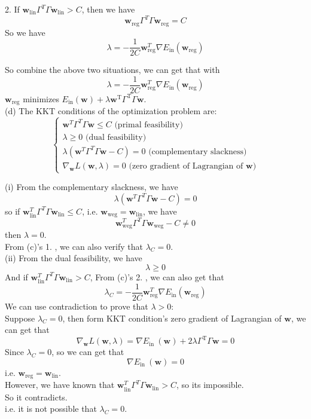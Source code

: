 2. If $\mathbf{w}_{\text{lin}}\Gamma^{T} \Gamma \mathbf{w}_{\text{lin}}> C$, then we have
$$\mathbf{w}_{\text{reg}}\Gamma^{T} \Gamma \mathbf{w}_{\text{reg}}= C$$
So we have
$$\lambda = -\dfrac{1}{2C}\mathbf{w}_{\text{reg}}^T\nabla E_{\text{in}}(\mathbf{w}_{\text{reg}})$$

So combine the above two situations, we can get that with
$$\lambda = -\dfrac{1}{2C}\mathbf{w}_{\text{reg}}^T\nabla E_{\text{in}}(\mathbf{w}_{\text{reg}})$$
$\mathbf{w}_{\text{reg}}$ minimizes $E_{\text{in}}(\mathbf{w})+\lambda \mathbf{w}^{\mathrm{T}} \Gamma^{\mathrm{T}} \Gamma \mathbf{w}$.\\

(d) The KKT conditions of the optimization problem are:
\begin{equation}
\left\{\begin{array}{l}
    \mathbf{w}^T\Gamma^{T} \Gamma \mathbf{w}\leq C              \text{\ \ \ \ \ \ \ \ \ \ \ \ \ \ \ \ \ \ (primal feasibility)}\\
    \lambda\geq 0                                               \text{\ \ \ \ \ \ \ \ \ \ \ \ \ \ \ \ \ \ \ \ \ \ \ \ \ \ \ \ \ \ \ \ \ \ (dual feasibility)}\\
    \lambda(\mathbf{w}^T\Gamma^{T} \Gamma \mathbf{w}- C)=0      \text{\ \ \ \ \ \ (complementary slackness)}\\
    \nabla_{\mathbf{w}} L(\mathbf{w},\lambda)=0                  \text{\ \ \ \ \ \ \ \ \ \ \ \ \ \ \ \ \ (zero gradient of Lagrangian of $\mathbf{w}$)}
    \end{array}\right.
\label{KKT}
\end{equation}

(i) From the complementary slackness, we have 
$$\lambda(\mathbf{w}^T\Gamma^{T} \Gamma \mathbf{w}- C)=0$$
so if $\mathbf{w}_{\text{lin}}^T\Gamma^{T} \Gamma \mathbf{w}_{\text{lin}}\leq C$, i.e. $\mathbf{w}_{\text{weg}}=\mathbf{w}_{\text{lin}}$, we have
$$\mathbf{w}_{\text{weg}}^T\Gamma^{T} \Gamma \mathbf{w}_{\text{weg}} - C \neq 0$$
then $\lambda=0$.\\
From (c)'s 1. , we can also verify that $\lambda_C=0$.\\

(ii) From the dual feasibility, we have $$\lambda\geq 0$$
And if $\mathbf{w}_{\text{lin}}^T\Gamma^{T} \Gamma \mathbf{w}_{\text{lin}}>C$, 
From (c)'s 2. , we can also get that 
$$\lambda_C=-\dfrac{1}{2C}\mathbf{w}_{\text{reg}}^T\nabla E_{\text{in}}(\mathbf{w}_{\text{reg}})$$
We can use contradiction to prove that $\lambda>0$:\\
Suppose $\lambda_C=0$, then form KKT condition's zero gradient of Lagrangian of $\mathbf{w}$, we can get that
$$\nabla_{\mathbf{w}}L(\mathbf{w},\lambda)=\nabla E_{\text {in }}(\mathbf{w})+2\lambda\Gamma^{\mathrm{T}} \Gamma \mathbf{w} = 0$$
Since $\lambda_C=0$, so we can get that
$$\nabla E_{\text {in }}(\mathbf{w})=0$$
i.e. $\mathbf{w}_{\text{reg}}=\mathbf{w}_{\text{lin}}$.\\
However, we have known that $\mathbf{w}_{\text{lin}}^T\Gamma^{T} \Gamma \mathbf{w}_{\text{lin}}>C$, so its impossible.\\
So it contradicts.\\
i.e. it is not possible that $\lambda_C=0$.


